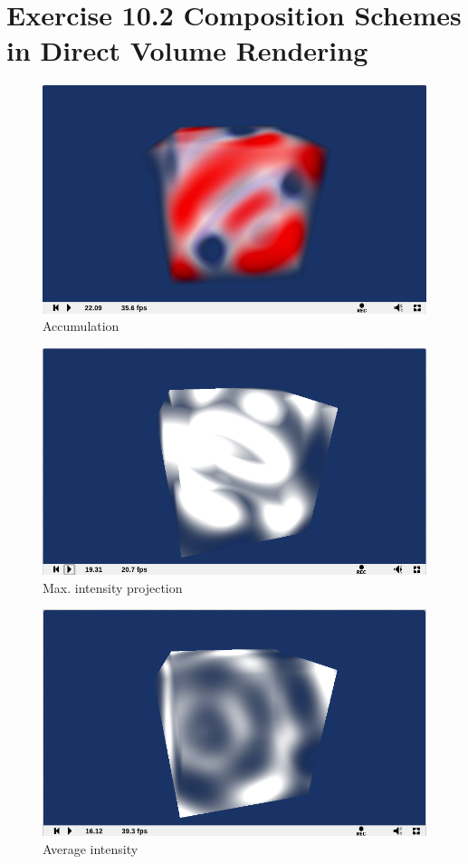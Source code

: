 \documentclass[a4paper]{article}
\begin{document}
\newpage
\section*{Exercise 10.2 Composition Schemes in Direct Volume Rendering}

\begin{figure}[!ht]
	\centering
	\includegraphics[width=0.62\linewidth]{1}
	\caption{Accumulation}
	\label{fig:1}
\end{figure}

\begin{figure}[!ht]
	\centering
	\includegraphics[width=0.62\linewidth]{2}
	\caption{Max. intensity projection}
	\label{fig:2}
\end{figure}

\begin{figure}[!ht]
	\centering
	\includegraphics[width=0.62\linewidth]{3}
	\caption{Average intensity}
	\label{fig:3}
\end{figure}
\end{document}
